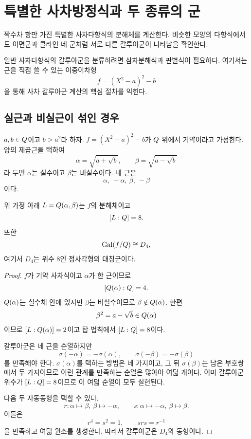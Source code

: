 \clearpage
\section{특별한 사차방정식과 두 종류의 군}
\label{sec:biquadratic-quartics}

\begin{learninggoal}
짝수차 항만 가진 특별한 사차다항식의 분해체를 계산한다. 비슷한 모양의 다항식에서도 이면군과 클라인 네 군처럼 서로 다른 갈루아군이 나타남을 확인한다.
\end{learninggoal}

일반 사차다항식의 갈루아군을 분류하려면 삼차분해식과 판별식이 필요하다. 여기서는 근을 직접 쓸 수 있는 이중이차형
\[
  f=(X^2-a)^2-b
\]
을 통해 사차 갈루아군 계산의 핵심 절차를 익힌다.

\subsection{실근과 비실근이 섞인 경우}

$a,b\in Q$이고 $b>a^2$라 하자. $f=(X^2-a)^2-b$가 $Q$ 위에서 기약이라고 가정한다. 양의 제곱근을 택하여
\[
  \alpha=\sqrt{a+\sqrt b},
  \qquad
  \beta=\sqrt{a-\sqrt b}
\]
라 두면 $\alpha$는 실수이고 $\beta$는 비실수이다. 네 근은
\[
  \alpha,\ -\alpha,\ \beta,\ -\beta
\]
이다.

\begin{theorem}
위 가정 아래 $L=Q(\alpha,\beta)$는 $f$의 분해체이고
\[
  [L:Q]=8.
\]
또한
\[
  \operatorname{Gal}(f/Q)\cong D_4,
\]
여기서 $D_4$는 위수 $8$인 정사각형의 대칭군이다.
\end{theorem}

\begin{proof}
$f$가 기약 사차식이고 $\alpha$가 한 근이므로
\[
  [Q(\alpha):Q]=4.
\]
$Q(\alpha)$는 실수체 안에 있지만 $\beta$는 비실수이므로 $\beta\notin Q(\alpha)$. 한편
\[
  \beta^2=a-\sqrt b\in Q(\alpha)
\]
이므로 $[L:Q(\alpha)]=2$이고 탑 법칙에서 $[L:Q]=8$이다.

갈루아군은 네 근을 순열하지만
\[
  \sigma(-\alpha)=-\sigma(\alpha),
  \qquad
  \sigma(-\beta)=-\sigma(\beta)
\]
를 만족해야 한다. $\sigma(\alpha)$를 택하는 방법은 네 가지이고, 그 뒤 $\sigma(\beta)$는 남은 부호쌍에서 두 가지이므로 이런 관계를 만족하는 순열은 많아야 여덟 개이다. 이미 갈루아군 위수가 $[L:Q]=8$이므로 이 여덟 순열이 모두 실현된다.

다음 두 자동동형을 택할 수 있다.
\[
  r:\alpha\mapsto\beta,\ \beta\mapsto-\alpha,
  \qquad
  s:\alpha\mapsto-\alpha,\ \beta\mapsto\beta.
\]
이들은
\[
  r^4=s^2=1,
  \qquad
  srs=r^{-1}
\]
을 만족하고 여덟 원소를 생성한다. 따라서 갈루아군은 $D_4$와 동형이다.
\end{proof}

